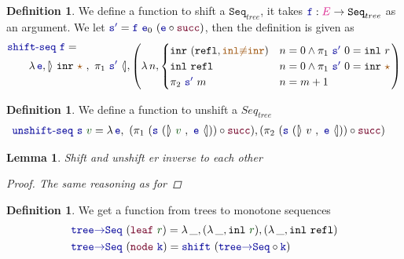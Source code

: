 \documentclass[twoside,11pt,openright]{report}
\theoremstyle{plain} %
\newtheorem{lem}[thm]{Lemma}
\theoremstyle{definition}
\newtheorem{defn}[thm]{Definition}%
\theoremstyle{remark}
\newcommand*{\term}[1]{\textcolor{green!30!black}{#1}} %
\newcommand*{\type}[1]{\textcolor{magenta!90!black}{#1}}
\newcommand*{\constant}[1]{\textcolor{orange!60!black}{\ensuremath{\mathtt{#1}}}}
\newcommand*{\function}[1]{\textcolor{blue!60!black}{\ensuremath{\mathtt{#1}}}}
\newcommand*{\constructor}[1]{\textcolor{purple!60!black}{\ensuremath{\mathtt{#1}}}}
\newcommand*{\typeformer}[1]{\ensuremath{\mathtt{#1}}}
\newcommand*{\unitelem}{\constant{\star}} %
\newcommand*{\natcases}[2]{\ensuremath{\mathbb{[\hspace{-.5mm}\rangle}~\ensuremath{#1}~,~\ensuremath{#2}~\mathbb{\langle\hspace{-.5mm}]}}}
\begin{document}
\begin{defn}
  We define a function to shift a \(\typeformer{Seq}_{tree}\), it takes \(\function{f} : \type{E} \rightarrow \typeformer{Seq}_{tree}\) as an argument. We let \(\function{s'} = \function{f}~\function{e}_0~(\function{e} \circ \constructor{succ})\), then the definition is given as
  \begin{equation}
    \begin{aligned}
      &\function{shift\text{-}seq}~\function{f} = \\[-5mm]
      &\qquad \lambda\,\function{e}, \natcases{\mathtt{inr}~\unitelem}{\pi_1~\function{s'}} , \left(\lambda\,n, \begin{cases} \mathtt{inr}~(\mathtt{refl} , \constant{inl{\not\equiv}inr}) & n = 0 \land \pi_1~\function{s'}~0 = \mathtt{inl}~r \\ \mathtt{inl}~\mathtt{refl} & n = 0 \land \pi_1~\function{s'}~0 = \mathtt{inr}~\unitelem \\ \pi_2~\function{s'}~m & n = m + 1 \end{cases}\right)
    \end{aligned}
  \end{equation}
\end{defn}
\begin{defn}
  We define a function to unshift a \(Seq_{tree}\)
  \begin{equation}
    \begin{aligned}
      &\function{unshift\text{-}seq}~\function{s}~\term{v} = \lambda\,\function{e},~(\pi_1~(\function{s}~(\natcases{\term{v}}{\function{e}})) \circ \constructor{succ}) , (\pi_2~(\function{s}~(\natcases{v}{\function{e}})) \circ \constructor{succ})
    \end{aligned}
  \end{equation}
\end{defn}
\begin{lem}
  Shift and unshift er inverse to each other
  \begin{proof}
    The same reasoning as for 
  \end{proof}
\end{lem}
\begin{defn}
  We get a function from trees to monotone sequences
  \begin{equation}
    \begin{aligned}
      &\function{tree{\rightarrow}Seq}~(\constructor{leaf}~\term{r}) = \lambda\,\_, (\lambda\,\_, \mathtt{inl}~\term{r}) , (\lambda\,\_, \mathtt{inl}~\mathtt{refl}) \\
      &\function{tree{\rightarrow}Seq}~(\constructor{node}~\function{k}) = \function{shift}~(\function{tree{\rightarrow}Seq} \circ \function{k})
    \end{aligned}
  \end{equation}
\end{defn}
\end{document}
